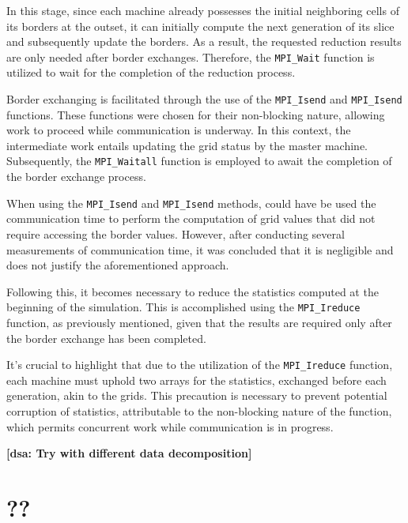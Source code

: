 \documentclass{article}
\newcommand{\dsanote}[1]{\textbf{[dsa: #1]}}
\begin{document}
In this stage, since each machine already possesses the initial neighboring cells of its borders at the outset, it 
can initially compute the next generation of its slice and subsequently update the borders. As a result, the requested 
reduction results are only needed after border exchanges. Therefore, the \texttt{MPI\_Wait} function is utilized to wait 
for the completion of the reduction process.


Border exchanging is facilitated through the use of the \texttt{MPI\_Isend} and \texttt{MPI\_Isend} functions.
These functions were chosen for their non-blocking nature, allowing work to proceed while communication is underway. 
In this context, the intermediate work entails updating the grid status by the master machine. Subsequently, the 
\texttt{MPI\_Waitall} function is employed to await the completion of the border exchange process.

When using the \texttt{MPI\_Isend} and \texttt{MPI\_Isend} methods, could have be used the communication time to 
perform the computation of grid values that did not require accessing the border values. However, after conducting 
several measurements of communication time, it was concluded that it is negligible and does not 
justify the aforementioned approach.

Following this, it becomes necessary to reduce the statistics computed at the beginning of the simulation. 
This is accomplished using the \texttt{MPI\_Ireduce} function, as previously mentioned, given that the results 
are required only after the border exchange has been completed.

It's crucial to highlight that due to the utilization of the \texttt{MPI\_Ireduce} function, each machine must uphold 
two arrays for the statistics, exchanged before each generation, akin to the grids. This precaution is necessary to 
prevent potential corruption of statistics, attributable to the non-blocking nature of the function, which permits concurrent 
work while communication is in progress.



\dsanote{Try with different data decomposition}

\section{??}
\end{document}
